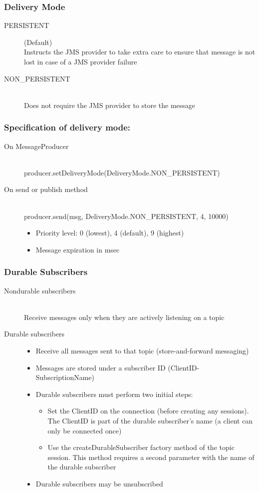 \documentclass[10pt]{article}
\begin{document}
\subsubsection{Delivery Mode}
\begin{description}
	\item[PERSISTENT] (Default)\hfill \\
		Instructs the JMS provider to take extra care to ensure that message is not lost in case of a JMS provider failure
	\item[NON\_PERSISTENT] \hfill \\
		Does not require the JMS provider to store the message
\end{description}
\subsubsection{Specification of delivery mode:}
\begin{description}
	\item[On MessageProducer] \hfill \\
		producer.setDeliveryMode(DeliveryMode.NON\_PERSISTENT)
	\item[On send or publish method] \hfill \\
		producer.send(msg, DeliveryMode.NON\_PERSISTENT, 4, 10000)
		\begin{itemize}
			\item Priority level: 0 (lowest), 4 (default), 9 (highest)
			\item Message expiration in msec
		\end{itemize}
\end{description}
\subsubsection{Durable Subscribers}
\begin{description}
	\item[Nondurable subscribers] \hfill \\
		Receive messages only when they are actively listening on a topic
	\item[Durable subscribers] \hfill
		\begin{itemize}
			\item Receive all messages sent to that topic (store-and-forward messaging)
			\item Messages are stored under a subscriber ID (ClientID-SubscriptionName)
			\item Durable subscribers must perform two initial steps:
				\begin{itemize}
					\item Set the ClientID on the connection (before creating any sessions).\\ The ClientID is part of the durable subscriber's name (a client can only be connected once)
					\item Use the createDurableSubscriber factory method of the topic session. This method requires a second parameter with the name of the durable subscriber
				\end{itemize}
			\item Durable subscribers may be unsubscribed
		\end{itemize}
\end{description}
\end{document}
